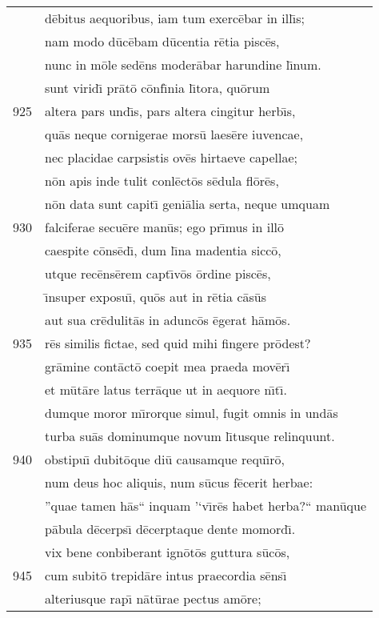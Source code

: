 \documentclass[paper=6in:9in,pagesize=pdftex,
               headinclude=on,footinclude=on,12pt]{scrbook}
\begin{document}
\begin{longtable}[p]{ r l }
 & d\=ebitus aequoribus, iam tum exerc\=ebar in ill\={\i}s;\\ 
 & nam modo d\=uc\=ebam d\=ucentia r\=etia pisc\=es,\\ 
 & nunc in m\=ole sed\=ens moder\=abar harundine l\={\i}num.\\ 
 & sunt virid\={\i} pr\=at\=o c\=onf\={\i}nia l\={\i}tora, qu\=orum\\ 
925 & altera pars und\={\i}s, pars altera cingitur herb\={\i}s,\\ 
 & qu\=as neque cornigerae mors\=u laes\=ere iuvencae,\\ 
 & nec placidae carpsistis ov\=es hirtaeve capellae;\\ 
 & n\=on apis inde tulit conl\=ect\=os s\=edula fl\=or\=es,\\ 
 & n\=on data sunt capit\={\i} geni\=alia serta, neque umquam\\ 
930 & falciferae secu\=ere man\=us; ego pr\={\i}mus in ill\=o\\ 
 & caespite c\=ons\=ed\={\i}, dum l\={\i}na madentia sicc\=o,\\ 
 & utque rec\=ens\=erem capt\={\i}v\=os \=ordine pisc\=es,\\ 
 & \={\i}nsuper exposu\={\i}, qu\=os aut in r\=etia c\=as\=us\\ 
 & aut sua cr\=edulit\=as in adunc\=os \=egerat h\=am\=os.\\ 
935 & r\=es similis fictae, sed quid mihi fingere pr\=odest?\\ 
 & gr\=amine cont\=act\=o coepit mea praeda mov\=er\={\i}\\ 
 & et m\=ut\=are latus terr\=aque ut in aequore n\={\i}t\={\i}.\\ 
 & dumque moror m\={\i}rorque simul, fugit omnis in und\=as\\ 
 & turba su\=as dominumque novum l\={\i}tusque relinquunt.\\ 
940 & obstipu\={\i} dubit\=oque di\=u causamque requ\={\i}r\=o,\\ 
 & num deus hoc aliquis, num s\=ucus f\=ecerit herbae:\\ 
 & ''quae tamen h\=as`` inquam '`v\={\i}r\=es habet herba?`` man\=uque\\ 
 & p\=abula d\=ecerps\={\i} d\=ecerptaque dente momord\={\i}.\\ 
 & vix bene conbiberant ign\=ot\=os guttura s\=uc\=os,\\ 
945 & cum subit\=o trepid\=are intus praecordia s\=ens\={\i}\\ 
 & alteriusque rap\={\i} n\=at\=urae pectus am\=ore;\\ 

\end{longtable}
\end{document}

